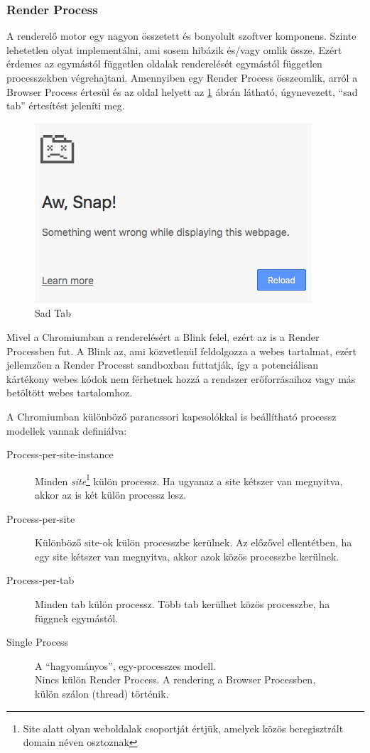 \documentclass[12pt]{report}
\begin{document}
\subsubsection{Render Process}
A renderelő motor egy nagyon összetett és bonyolult szoftver komponens. Szinte lehetetlen
olyat implementálni, ami sosem hibázik és/vagy omlik össze. \cite{bib:chromium-multi-process}
Ezért érdemes az egymástól független oldalak renderelését egymástól független
processzekben végrehajtani. Amennyiben egy Render Process összeomlik, arról a
Browser Process értesül és az oldal helyett az \ref{fig:sad-tab} ábrán látható,
úgynevezett, ``sad tab'' értesítést jeleníti meg.

\begin{figure}[h]
    \centering
    \includegraphics[scale=0.8]{sad-tab}
    \caption{
        \label{fig:sad-tab}
        Sad Tab
    }
\end{figure}

Mivel a Chromiumban a renderelésért a Blink felel, ezért az is a Render Processben fut.
A Blink az, ami közvetlenül feldolgozza a webes tartalmat, ezért jellemzően a
Render Processt sandboxban futtatják, így a potenciálisan kártékony webes kódok nem
férhetnek hozzá a rendszer erőforrásaihoz vagy más betöltött webes tartalomhoz.

A Chromiumban különböző parancssori kapcsolókkal is beállítható processz modellek
vannak definiálva:
\begin{description}
    \item[Process-per-site-instance]
        Minden \textit{site}\footnote{Site alatt olyan weboldalak csoportját értjük, amelyek
        közös beregisztrált domain néven osztoznak} külön processz.
        Ha ugyanaz a site kétszer van megnyitva, akkor az is két külön processz lesz.
    \item[Process-per-site]
        Különböző site-ok külön processzbe kerülnek. Az előzővel ellentétben, ha egy site
        kétszer van megnyitva, akkor azok közös processzbe kerülnek.
    \item[Process-per-tab]
        Minden tab külön processz. Több tab kerülhet közös processzbe, ha függnek egymástól.
    \item[Single Process]
        A ``hagyományos'', egy-processzes modell. \\
        Nincs külön Render Process. A rendering a Browser Processben, \\
        külön szálon (thread) történik.
\end{description}
\end{document}
